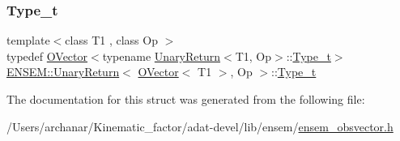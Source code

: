 \subsubsection{\texorpdfstring{Type\_t}{Type\_t}\hspace{0.1cm}{\footnotesize\ttfamily [3/3]}}
{\footnotesize\ttfamily template$<$class T1 , class Op $>$ \\
typedef \mbox{\hyperlink{classENSEM_1_1OVector}{O\+Vector}}$<$typename \mbox{\hyperlink{structENSEM_1_1UnaryReturn}{Unary\+Return}}$<$T1, Op$>$\+::\mbox{\hyperlink{structENSEM_1_1UnaryReturn_3_01OVector_3_01T1_01_4_00_01Op_01_4_a271ecea83fd5cd6b106bd500ff150660}{Type\+\_\+t}}$>$ \mbox{\hyperlink{structENSEM_1_1UnaryReturn}{E\+N\+S\+E\+M\+::\+Unary\+Return}}$<$ \mbox{\hyperlink{classENSEM_1_1OVector}{O\+Vector}}$<$ T1 $>$, Op $>$\+::\mbox{\hyperlink{structENSEM_1_1UnaryReturn_3_01OVector_3_01T1_01_4_00_01Op_01_4_a271ecea83fd5cd6b106bd500ff150660}{Type\+\_\+t}}}



The documentation for this struct was generated from the following file\+:\begin{DoxyCompactItemize}
\item 
/\+Users/archanar/\+Kinematic\+\_\+factor/adat-\/devel/lib/ensem/\mbox{\hyperlink{adat-devel_2lib_2ensem_2ensem__obsvector_8h}{ensem\+\_\+obsvector.\+h}}\end{DoxyCompactItemize}
